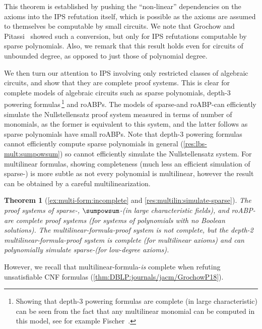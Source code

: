 \documentclass[11pt]{article}
\numberwithin{equation}{section}
\newtheorem{theorem}{Theorem}[section]
\theoremstyle{definition}
\theoremstyle{plain}
\begin{document}
This theorem is established by pushing the ``non-linear'' dependencies on the axioms into the IPS refutation itself, which is possible as the axioms are assumed to themselves be computable by small circuits.  We note that Grochow and Pitassi~\cite{DBLP:journals/jacm/GrochowP18} showed such a conversion, but only for IPS refutations computable by sparse polynomials.  Also, we remark that this result holds even for circuits of unbounded degree, as opposed to just those of polynomial degree.

We then turn our attention to IPS involving only restricted classes of algebraic circuits, and show that they are complete proof systems.  This is clear for complete models of algebraic circuits such as sparse polynomials, depth-3 powering formulas\,\footnote{Showing that depth-3 powering formulas are complete (in large characteristic) can be seen from the fact that any multilinear monomial can be computed in this model, see for example Fischer~\cite{Fischer94}.} and roABPs.  The models of sparse-\lIPS and roABP-\lIPS can efficiently simulate the Nullstellensatz proof system measured in terms of number of monomials, as the former is equivalent to this system, and the latter follows as sparse polynomials have small roABPs.  Note that depth-3 powering formulas cannot efficiently compute sparse polynomials in general (\autoref{res:lbs-mult:sumpowsum}) so cannot efficiently simulate the Nullstellensatz system. For multilinear formulas, showing completeness (much less an efficient simulation of sparse-\lIPS) is more subtle as not every polynomial is multilinear, however the result can be obtained by a careful multilinearization.

\begin{theorem}[\autoref{ex:multi-form:incomplete} and \autoref{res:multilin:simulate-sparse}]
        The proof systems of sparse-\lIPS, $\sumpowsum$-\lIPS (in large characteristic fields), and roABP-\lIPS are complete proof systems (for systems of polynomials with no Boolean solutions).  The multilinear-formula-\lIPS proof system is not complete, but the depth-2 multilinear-formula-\lbIPS proof system is complete (for multilinear axioms) and can polynomially simulate sparse-\lIPS (for low-degree axioms).
\end{theorem}

However, we recall that multilinear-formula-\lIPS \emph{is} complete when refuting unsatisfiable CNF formulas (\autoref{thm:DBLP:journals/jacm/GrochowP18}).
\end{document}
